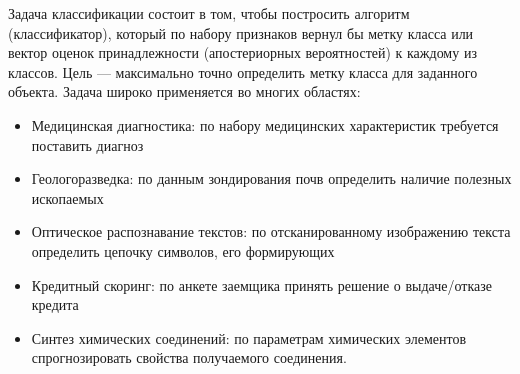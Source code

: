 \documentclass[times,specification,annotation]{itmo-student-thesis}
\begin{document}
	
	
	
	
	
	
	
	\tableofcontents
	
	\startprefacepage
	Задача классификации состоит в том, чтобы постросить алгоритм (классификатор), который по набору признаков вернул бы метку класса или вектор оценок принадлежности (апостериорных вероятностей) к каждому из классов. Цель --- максимально точно определить метку класса для заданного объекта. Задача широко применяется во многих областях:
	\begin{itemize}
		\item Медицинская диагностика: по набору медицинских характеристик требуется поставить диагноз
		\item Геологоразведка: по данным зондирования почв определить наличие полезных ископаемых
		\item Оптическое распознавание текстов: по отсканированному изображению текста определить цепочку символов, его формирующих
		\item Кредитный скоринг: по анкете заемщика принять решение о выдаче/отказе кредита
		\item Синтез химических соединений: по параметрам химических элементов спрогнозировать свойства получаемого соединения.
	\end{itemize}
	
\end{document}
